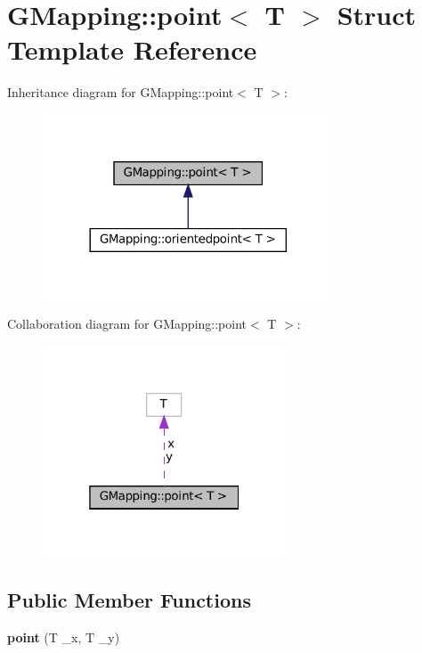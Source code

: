\hypertarget{structGMapping_1_1point}{}\section{G\+Mapping\+:\+:point$<$ T $>$ Struct Template Reference}
\label{structGMapping_1_1point}


Inheritance diagram for G\+Mapping\+:\+:point$<$ T $>$\+:
\nopagebreak
\begin{figure}[H]
\begin{center}
\leavevmode
\includegraphics[width=245pt]{structGMapping_1_1point__inherit__graph}
\end{center}
\end{figure}


Collaboration diagram for G\+Mapping\+:\+:point$<$ T $>$\+:
\nopagebreak
\begin{figure}[H]
\begin{center}
\leavevmode
\includegraphics[width=205pt]{structGMapping_1_1point__coll__graph}
\end{center}
\end{figure}
\subsection*{Public Member Functions}
\begin{DoxyCompactItemize}
\item 
\mbox{\label{structGMapping_1_1point_a8c10e5be8877b8799fd66ca5f7ba17b0}} 
{\bfseries point} (T \+\_\+x, T \+\_\+y)
\end{DoxyCompactItemize}
